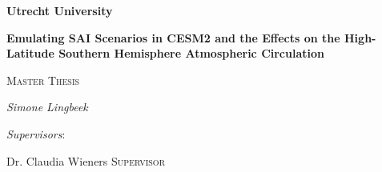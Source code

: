 
\begin{titlepage} %
	\noindent

    \par\vspace{1cm}
    
    \begin{flushright}
    {\LARGE\bfseries Utrecht University \par} %
    \end{flushright}
	\vspace{1cm}
    \begin{center}
    {\huge\bfseries Emulating SAI Scenarios in CESM2 and the Effects on the High-Latitude Southern Hemisphere Atmospheric Circulation\par} %
    \end{center}
	\vspace{1cm}
    {\scshape\Large Master Thesis\par}
	\vspace{0.5cm} %
	{\Large\itshape Simone Lingbeek\par} %
    \vspace{0.5cm}
    \raggedleft
	{\Large\itshape Supervisors}:\par\vspace{0.25cm}
	{\large Dr. Claudia Wieners \textsc{Supervisor}\par} %

\end{titlepage}
